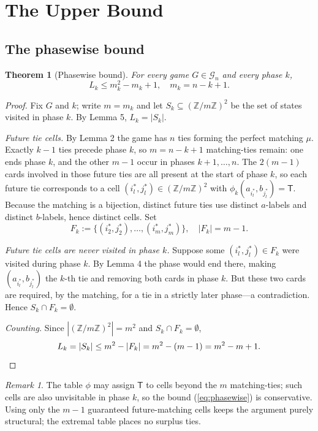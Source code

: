 \documentclass[11pt]{article}
\newtheorem{theorem}{Theorem}
\theoremstyle{definition}
\theoremstyle{remark}
\newtheorem{remark}{Remark}
\newcommand{\TT}{\mathsf{T}}
\begin{document}
\section{The Upper Bound}\label{sec:upper}
\subsection{The phasewise bound}
\begin{theorem}[Phasewise bound]\label{thm:phasewise}
For every game $G\in\mathcal{G}_n$ and every phase $k$,
\begin{equation}\label{eq:phasewise}
L_k\le m_k^2-m_k+1, \quad m_k=n-k+1.
\end{equation}
\end{theorem}
\begin{proof}
Fix $G$ and $k$; write $m=m_k$ and let $S_k\subseteq(\mathbb{Z}/m\mathbb{Z})^2$ be the set of states visited in phase $k$. By Lemma 5, $L_k=|S_k|$.

\emph{Future tie cells.} By Lemma 2 the game has $n$ ties forming the perfect matching $\mu$. Exactly $k-1$ ties precede phase $k$, so $m=n-k+1$ matching-ties remain: one ends phase $k$, and the other $m-1$ occur in phases $k+1,\dots,n$. The $2(m-1)$ cards involved in those future ties are all present at the start of phase $k$, so each future tie corresponds to a cell $(i_l^*,j_l^*)\in(\mathbb{Z}/m\mathbb{Z})^2$ with $\phi_k(a_{i_l^*},b_{j_l^*})=\TT$. Because the matching is a bijection, distinct future ties use distinct $a$-labels and distinct $b$-labels, hence distinct cells. Set
\begin{equation}
F_k:=\{(i_2^*,j_2^*),\dots,(i_m^*,j_m^*)\}, \quad |F_k|=m-1.
\end{equation}

\emph{Future tie cells are never visited in phase $k$.} Suppose some $(i_l^*,j_l^*)\in F_k$ were visited during phase $k$. By Lemma 4 the phase would end there, making $(a_{i_l^*},b_{j_l^*})$ the $k$-th tie and removing both cards in phase $k$. But these two cards are required, by the matching, for a tie in a strictly later phase---a contradiction. Hence $S_k\cap F_k=\emptyset$.

\emph{Counting.} Since $|(\mathbb{Z}/m\mathbb{Z})^2|=m^2$ and $S_k\cap F_k=\emptyset$,
\[
L_k = |S_k| \le m^2 - |F_k| = m^2 - (m-1) = m^2 - m + 1. \qedhere
\]
\end{proof}

\begin{remark} The table $\phi$ may assign $\TT$ to cells beyond the $m$ matching-ties; such cells are also unvisitable in phase $k$, so the bound (\ref{eq:phasewise}) is conservative. Using only the $m-1$ guaranteed future-matching cells keeps the argument purely structural; the extremal table places no surplus ties.
\end{remark}
\end{document}
